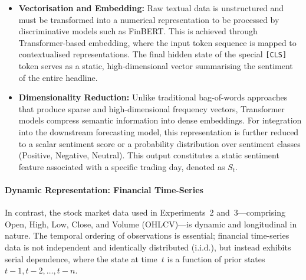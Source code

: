 \documentclass[12pt]{ucetd}
\begin{document}
\begin{itemize}
    \item \textbf{Vectorisation and Embedding:}
    Raw textual data is unstructured and must be transformed into a numerical representation to be processed by discriminative models such as FinBERT. This is achieved through Transformer-based embedding, where the input token sequence is mapped to contextualised representations. The final hidden state of the special \texttt{[CLS]} token serves as a static, high-dimensional vector summarising the sentiment of the entire headline.

    \item \textbf{Dimensionality Reduction:}
    Unlike traditional bag-of-words approaches that produce sparse and high-dimensional frequency vectors, Transformer models compress semantic information into dense embeddings. For integration into the downstream forecasting model, this representation is further reduced to a scalar sentiment score or a probability distribution over sentiment classes (Positive, Negative, Neutral). This output constitutes a static sentiment feature associated with a specific trading day, denoted as $S_t$.
\end{itemize}

\paragraph{Dynamic Representation: Financial Time-Series}

In contrast, the stock market data used in Experiments~2 and~3---comprising Open, High, Low, Close, and Volume (OHLCV)---is dynamic and longitudinal in nature. The temporal ordering of observations is essential; financial time-series data is not independent and identically distributed (i.i.d.), but instead exhibits serial dependence, where the state at time~$t$ is a function of prior states $t-1, t-2, \dots, t-n$.
\end{document}
